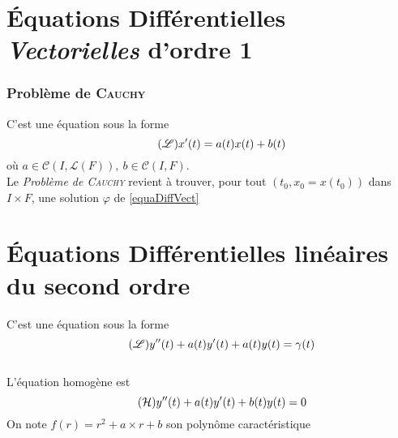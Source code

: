 \documentclass[11pt,a4paper,fleqn,pdftex]{report}
\begin{document}
\section{Équations Différentielles \emph{Vectorielles} d'ordre 1}
\subsubsection{Problème de \textsc{Cauchy}} %
\label{ssub:probleme_de_Cauchy}
\begin{dfn}
    C'est une équation sous la forme 
\begin{equation}\label{equaDiffVect}\tag{$\mathscr{L}$}
    x'(t) = a(t) x(t) + b(t)
\end{equation}
où $a \in \mathcal{C}\left( I,\mathscr{L}(F)\right), \: b\in \mathcal{C}(I,F)$. \\Le \emph{Problème de \textsc{Cauchy}}  revient à trouver, pour tout $(t_0,x_0=x(t_0))$ dans $I \times F$, une solution $\varphi$ de \eqref{equaDiffVect}
\end{dfn}
\section{Équations Différentielles linéaires du second ordre}
\begin{dfn}
    C'est une équation sous la forme 
\begin{equation}\label{eq:equaDiff2ndOrdre}\tag{$\mathscr{L}$}
    y''(t) + a(t) y'(t) + a(t)y(t)= \gamma (t)
\end{equation}
\hfill \\[0.5\baselineskip]
    L'équation homogène est
\begin{equation}\label{eq:equaDiff2ndOrdreHomogene}\tag{$\mathcal{H}$}
    y''(t) + a(t) y'(t) + b(t)y(t)= 0
\end{equation}
On note $f(r) = r^2 + a\times r + b$ %
son polynôme caractéristique
\end{dfn}
\end{document}
